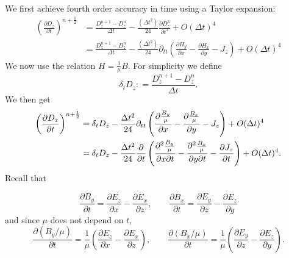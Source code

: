 \documentclass[12pt,reqno]{amsart}
\theoremstyle{definition}
\numberwithin{equation}{section}
\begin{document}
			\section{}\label{appendxib}
				We first achieve fourth order accuracy in time using a Taylor expansion:
			\begin{align*}
				\left (\frac{\partial D_z}{\partial t} \right)^{n+\frac{1}{2}} &= \frac{D_z^{n+1} - D_z^{n}}{\Delta t} - \frac{(\Delta t^2)}{24} \frac{\partial D^3_z}{\partial t^3} + O(\Delta t)^4 \\
				&= \frac{D_z^{n+1} - D_z^{n}}{\Delta t} - \frac{(\Delta t^2)}{24} \partial_{tt} \left(\frac{\partial H_y}{\partial x}
				- \frac{\partial H_x}{\partial y} -  J_z \right)
				+ O(\Delta t)^4
			\end{align*}
			We now use the relation $H \!=\! \frac{1}{\mu} B$. For simplicity we define
			\begin{equation}
				\label{Dhat}
				\delta_t D_z: = \frac{D_z^{n+1} - D_z^{n}}{\Delta t} .
			\end{equation}
			We then get
			\begin{align*}
				\left (\frac{\partial D_z}{\partial t} \right)^{n+\frac{1}{2}}  &= \delta_t D_z - \frac{\Delta t^2}{24} \partial_{tt} \left(\frac{\partial {B_y \over \mu}}{\partial x }
				- \frac{\partial{B_x \over \mu}}{\partial y} - J_z \right) + O(\Delta t)^4 \\
				&= \delta_t D_z - \frac{\Delta t^2}{24} \frac{\partial}{\partial t} \left(\frac{\partial^2 {B_y \over \mu}}{\partial x \partial t}
				- \frac{\partial^2 {B_x \over \mu}}{\partial y \partial t} - \frac{\partial J_z}{\partial t} \right) + O(\Delta t)^4.
			\end{align*}
			Recall that 
			
			$$
			\frac{\partial B_y}{\partial t}=\frac{\partial E_z}{\partial x}-\frac{\partial E_x}{\partial z},\qquad
			\frac{\partial B_x}{\partial t}=\frac{\partial E_y}{\partial z}-\frac{\partial E_z}{\partial y}
			$$
			and since $\mu$ does not depend on $t$,
			$$
			\frac{\partial (B_y/\mu)}{\partial t}=
			\frac{1}{\mu}\left (
			\frac{\partial E_z}{\partial x}-\frac{\partial E_x}{\partial z}
			\right), \qquad
			\frac{\partial (B_x/\mu)}{\partial t}=
			\frac{1}{\mu}\left (
			\frac{\partial E_y}{\partial z}-\frac{\partial E_z}{\partial y}
			\right) .
			$$
			
\end{document}
